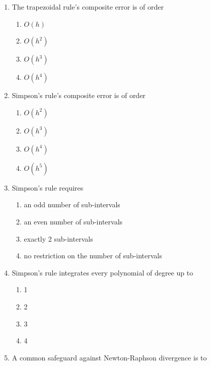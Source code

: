 \documentclass[
]{article}
\providecommand{\tightlist}{%
  \setlength{\itemsep}{0pt}\setlength{\parskip}{0pt}}
\begin{document}
\begin{enumerate}
  \begin{enumerate}
  \def\labelenumii{(\alph{enumii})}
  \tightlist
  \item
    multiplication by \(J\)
  \item
    solving a linear system involving the Jacobian \(J\)
  \item
    computing eigenvalues of \(J\)
  \item
    transposing \(J\)
  \end{enumerate}
\item
  The trapezoidal rule's composite error is of order

  \begin{enumerate}
  \def\labelenumii{(\alph{enumii})}
  \tightlist
  \item
    \(O(h)\)
  \item
    \(O(h^2)\)
  \item
    \(O(h^3)\)
  \item
    \(O(h^4)\)
  \end{enumerate}
\item
  Simpson's rule's composite error is of order

  \begin{enumerate}
  \def\labelenumii{(\alph{enumii})}
  \tightlist
  \item
    \(O(h^2)\)
  \item
    \(O(h^3)\)
  \item
    \(O(h^4)\)
  \item
    \(O(h^5)\)
  \end{enumerate}
\item
  Simpson's rule requires

  \begin{enumerate}
  \def\labelenumii{(\alph{enumii})}
  \tightlist
  \item
    an odd number of sub-intervals
  \item
    an even number of sub-intervals
  \item
    exactly 2 sub-intervals
  \item
    no restriction on the number of sub-intervals
  \end{enumerate}
\item
  Simpson's rule integrates every polynomial of degree up to

  \begin{enumerate}
  \def\labelenumii{(\alph{enumii})}
  \tightlist
  \item
    1
  \item
    2
  \item
    3
  \item
    4
  \end{enumerate}
\item
  A common safeguard against Newton-Raphson divergence is to


\end{enumerate}
\end{document}
